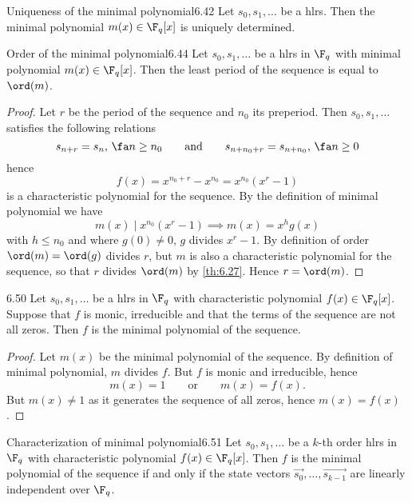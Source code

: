 \begin{teor}{Uniqueness of the minimal polynomial}{6.42}
	Let \(s_0,s_1,\ldots\) be a hlrs. Then the minimal polynomial \(m(x)\in\F_q[x]\) is uniquely determined.
\end{teor}

\begin{teor}{Order of the minimal polynomial}{6.44}
	Let \(s_0,s_1,\ldots\) be a hlrs in \(\F_q\) with minimal polynomial \(m(x)\in\F_q[x]\). Then the least period of the sequence is equal to \(\ord(m)\).
\end{teor}

\begin{proof}
	Let \(r\) be the period of the sequence and \(n_0\) its preperiod. Then \(s_0,s_1,\ldots\) satisfies the following relations
	\[
		s_{n+r} = s_n,\,\fa n \ge n_0 \qquad\text{and}\qquad s_{n+n_0+r} = s_{n+n_0},\,\fa n\ge 0
	\]
	hence
	\[
		f(x) = x^{n_0+r}-x^{n_0} = x^{n_0}(x^r-1)
	\]
	is a characteristic polynomial for the sequence. By the definition of minimal polynomial we have
	\[
		m(x) \mid x^{n_0}(x^r-1) \implies m(x) = x^h g(x)
	\]
	with \(h\le n_0\) and where \(g(0)\neq 0\), \(g\) divides \(x^r-1\). By definition of order \(\ord(m)=\ord(g)\) divides \(r\), but \(m\) is also a characteristic polynomial for the sequence, so that \(r\) divides \(\ord(m)\) by \autoref{th:6.27}. Hence \(r = \ord(m)\).
\end{proof}

\begin{prop}{}{6.50}
	Let \(s_0,s_1,\ldots\) be a hlrs in \(\F_q\) with characteristic polynomial \(f(x)\in\F_q[x]\). Suppose that \(f\) is monic, irreducible and that the terms of the sequence are not all zeros. Then \(f\) is the minimal polynomial of the sequence.
\end{prop}

\begin{proof}
	Let \(m(x)\) be the minimal polynomial of the sequence. By definition of minimal polynomial, \(m\) divides \(f\). But \(f\) is monic and irreducible, hence
	\[
		m(x) = 1 \qquad\text{or}\qquad m(x) = f(x).
	\]
	But \(m(x)\neq 1\) as it generates the sequence of all zeros, hence \(m(x)=f(x)\).
\end{proof}

\begin{teor}{Characterization of minimal polynomial}{6.51}
	Let \(s_0,s_1,\ldots\) be a \(k\)-th order hlrs in \(\F_q\) with characteristic polynomial \(f(x)\in\F_q[x]\). Then \(f\) is the minimal polynomial of the sequence if and only if the state vectors \(\vec{s_0},\ldots,\vec{s_{k-1}}\) are linearly independent over \(\F_q\).
\end{teor}

